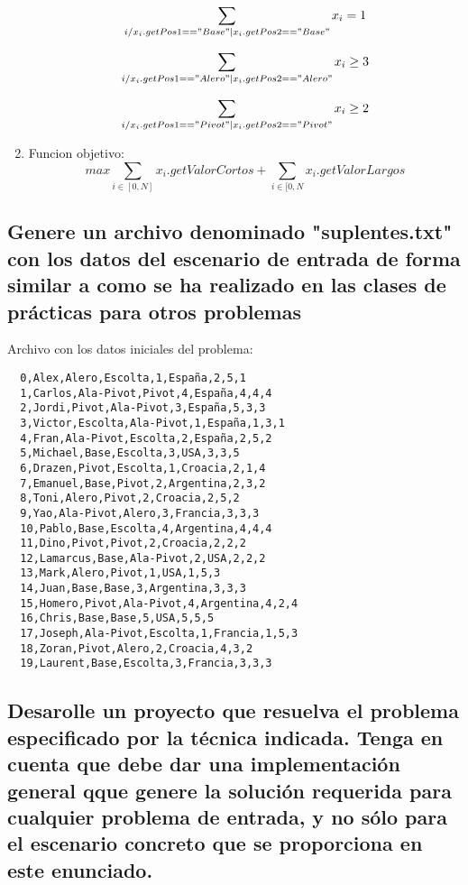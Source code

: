 \documentclass[a4paper,11pt]{article}
\begin{document}
\begin{enumerate}
\begin{equation}
 \sum_{i / x_i.getPos1=="Base" | x_i.getPos2=="Base"}{x_i} = 1
\end{equation}

\begin{equation}
 \sum_{i / x_i.getPos1=="Alero" | x_i.getPos2=="Alero"}{x_i} \geq 3
\end{equation}

\begin{equation}
 \sum_{i / x_i.getPos1=="Pivot" | x_i.getPos2=="Pivot"}{x_i} \geq 2
\end{equation}

\item Funcion objetivo:
\begin{equation*}
max  \sum_{i \in [0,N]}{x_i.getValorCortos}+\sum_{i \in [0,N}{x_i.getValorLargos}
\end{equation*}

\end{enumerate}


\subsection{Genere un archivo denominado "suplentes.txt" con los datos del escenario de entrada de forma similar a como se ha realizado en las clases de prácticas para otros problemas}
Archivo con los datos iniciales del problema:
\begin{verbatim}
  0,Alex,Alero,Escolta,1,España,2,5,1
  1,Carlos,Ala-Pivot,Pivot,4,España,4,4,4
  2,Jordi,Pivot,Ala-Pivot,3,España,5,3,3
  3,Victor,Escolta,Ala-Pivot,1,España,1,3,1
  4,Fran,Ala-Pivot,Escolta,2,España,2,5,2
  5,Michael,Base,Escolta,3,USA,3,3,5
  6,Drazen,Pivot,Escolta,1,Croacia,2,1,4
  7,Emanuel,Base,Pivot,2,Argentina,2,3,2
  8,Toni,Alero,Pivot,2,Croacia,2,5,2
  9,Yao,Ala-Pivot,Alero,3,Francia,3,3,3
  10,Pablo,Base,Escolta,4,Argentina,4,4,4
  11,Dino,Pivot,Pivot,2,Croacia,2,2,2
  12,Lamarcus,Base,Ala-Pivot,2,USA,2,2,2
  13,Mark,Alero,Pivot,1,USA,1,5,3
  14,Juan,Base,Base,3,Argentina,3,3,3
  15,Homero,Pivot,Ala-Pivot,4,Argentina,4,2,4
  16,Chris,Base,Base,5,USA,5,5,5
  17,Joseph,Ala-Pivot,Escolta,1,Francia,1,5,3
  18,Zoran,Pivot,Alero,2,Croacia,4,3,2
  19,Laurent,Base,Escolta,3,Francia,3,3,3
\end{verbatim}
\subsection{Desarolle un proyecto que resuelva el problema especificado por la técnica indicada. Tenga en cuenta que debe dar una implementación general qque genere la solución requerida para cualquier problema de entrada, y no sólo para el escenario concreto que se proporciona en este enunciado.}
\end{document}
